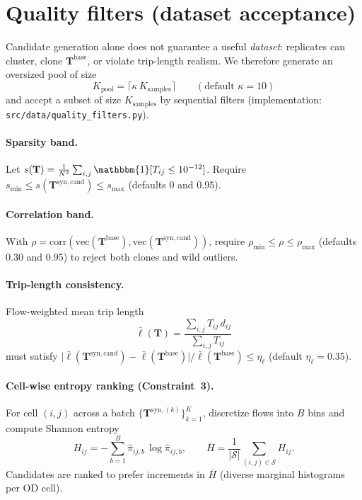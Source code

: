 \documentclass[11pt,a4paper]{report}
\newcommand{\Tbase}{\mathbf{T}^{\mathrm{base}}}
\newcommand{\Tsynk}[1]{\mathbf{T}^{\mathrm{syn},(#1)}}
\newcommand{\Tsycand}{\mathbf{T}^{\mathrm{syn,cand}}}
\newcommand{\mathbfT}{\mathbf{T}}
\begin{document}
\section{Quality filters (dataset acceptance)}
\label{sec:ch1-filters}

Candidate generation alone does not guarantee a useful \emph{dataset}: replicates can cluster, clone $\Tbase$, or violate trip-length realism. We therefore generate an oversized pool of size
\begin{equation}
    K_{\mathrm{pool}} = \lceil \kappa\, K_{\mathrm{samples}}\rceil
    \qquad (\text{default }\kappa=10)
\end{equation}
and accept a subset of size $K_{\mathrm{samples}}$ by sequential filters (implementation: \texttt{src/data/quality\_filters.py}).

\paragraph{Sparsity band.}
Let $s(\mathbfT)=\frac{1}{N^2}\sum_{i,j}\mathbbm{1}[T_{ij}\le 10^{-12}]$. Require
$s_{\min}\le s(\Tsycand)\le s_{\max}$ (defaults $0$ and $0.95$).

\paragraph{Correlation band.}
With $\rho=\mathrm{corr}(\mathrm{vec}(\Tbase),\mathrm{vec}(\Tsycand))$, require
$\rho_{\min}\le\rho\le\rho_{\max}$ (defaults $0.30$ and $0.95$) to reject both clones and wild outliers.

\paragraph{Trip-length consistency.}
Flow-weighted mean trip length
\begin{equation}
    \bar{\ell}(\mathbfT)
    = \frac{\sum_{i,j} T_{ij}\, d_{ij}}{\sum_{i,j} T_{ij}}
\end{equation}
must satisfy
$\bigl|\bar{\ell}(\Tsycand)-\bar{\ell}(\Tbase)\bigr|/\bar{\ell}(\Tbase)
\le \eta_{\ell}$ (default $\eta_{\ell}=0.35$).

\paragraph{Cell-wise entropy ranking (Constraint~3).}
For cell $(i,j)$ across a batch $\{\Tsynk{k}\}_{k=1}^{K}$, discretize flows into $B$ bins and compute Shannon entropy
\begin{equation}
    H_{ij}
    = -\sum_{b=1}^{B} \hat{\pi}_{ij,b}\,\log \hat{\pi}_{ij,b},
    \qquad
    \overline{H}=\frac{1}{|\mathcal{S}|}\sum_{(i,j)\in\mathcal{S}} H_{ij}.
    \label{eq:cell_entropy}
\end{equation}
Candidates are ranked to prefer increments in $\overline{H}$ (diverse marginal histograms per OD cell).
\end{document}
